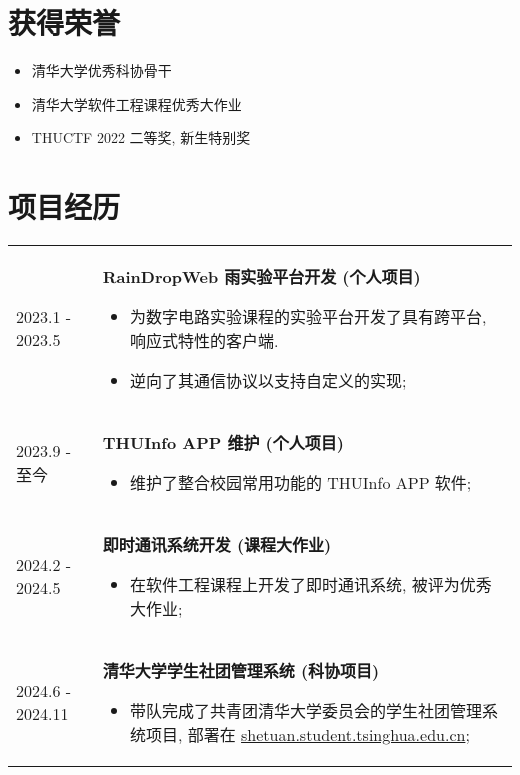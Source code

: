 \documentclass[a4paper, 10pt]{article}
\begin{document}
\section*{获得荣誉}
\begin{itemize}[left=0pt]
    \item 清华大学优秀科协骨干
    \item 清华大学软件工程课程优秀大作业
    \item THUCTF 2022 二等奖, 新生特别奖
\end{itemize}

\section*{项目经历}
\noindent
\begin{tabular}{p{}p{}}
    2023.1 - 2023.5 & \textbf{RainDropWeb 雨实验平台开发 (个人项目)}
        \fontsize{8pt}{10pt}\selectfont
        \begin{itemize}[left=0pt,topsep=0pt,partopsep=0pt,parsep=0pt,itemsep=0pt]
            \item 为数字电路实验课程的实验平台开发了具有跨平台, 响应式特性的客户端.
            \item 逆向了其通信协议以支持自定义的实现;
        \end{itemize} \\

        2023.9 - 至今 & \textbf{THUInfo APP 维护 (个人项目)}
        \fontsize{8pt}{10pt}\selectfont
        \begin{itemize}[left=0pt,topsep=0pt,partopsep=0pt,parsep=0pt,itemsep=0pt]
            \item 维护了整合校园常用功能的 THUInfo APP 软件;
        \end{itemize} \\

        2024.2 - 2024.5 & \textbf{即时通讯系统开发 (课程大作业)}
        \fontsize{8pt}{10pt}\selectfont \begin{itemize}[left=0pt,topsep=0pt,partopsep=0pt,parsep=0pt,itemsep=0pt]
            \item 在软件工程课程上开发了即时通讯系统, 被评为优秀大作业;
        \end{itemize} \\

        2024.6 - 2024.11 & \textbf{清华大学学生社团管理系统 (科协项目)}
        \fontsize{8pt}{10pt}\selectfont \begin{itemize}[left=0pt,topsep=0pt,partopsep=0pt,parsep=0pt,itemsep=0pt]
            \item 带队完成了共青团清华大学委员会的学生社团管理系统项目, 部署在 \href{https://shetuan.student.tsinghua.edu.cn}{shetuan.student.tsinghua.edu.cn};
        \end{itemize} \\


\end{tabular}
\end{document}
